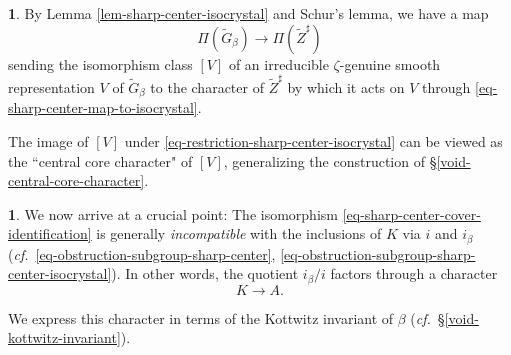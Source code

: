 \documentclass[10pt,english,reqno]{amsart}
\theoremstyle{definition}
\numberwithin{equation}{section}
\newtheorem{untitledsubsubsection}[subsubsection]{}
\newenvironment{void}
{\begin{untitledsubsubsection}}
{\end{untitledsubsubsection}}
\begin{document}
\begin{void}
By Lemma \ref{lem-sharp-center-isocrystal} and Schur's lemma, we have a map
\begin{equation}
\label{eq-restriction-sharp-center-isocrystal}
\Pi(\widetilde G_{\beta}) \rightarrow \Pi(\widetilde Z^{\sharp})
\end{equation}
sending the isomorphism class $[V]$ of an irreducible $\zeta$-genuine smooth representation $V$ of $\widetilde G_{\beta}$ to the character of $\widetilde Z^{\sharp}$ by which it acts on $V$ through \eqref{eq-sharp-center-map-to-isocrystal}.

The image of $[V]$ under \eqref{eq-restriction-sharp-center-isocrystal} can be viewed as the ``central core character" of $[V]$, generalizing the construction of \S\ref{void-central-core-character}.
\end{void}


\begin{void}
We now arrive at a crucial point: The isomorphism \eqref{eq-sharp-center-cover-identification} is generally \emph{incompatible} with the inclusions of $K$ via $i$ and $i_{\beta}$ (\emph{cf.}~\eqref{eq-obstruction-subgroup-sharp-center}, \eqref{eq-obstruction-subgroup-sharp-center-isocrystal}). In other words, the quotient $i_{\beta}/i$ factors through a character
\begin{equation}
\label{eq-isocrystal-sharp-kernel-difference}
K \rightarrow A.
\end{equation}

We express this character in terms of the Kottwitz invariant of $\beta$ (\emph{cf.}~\S\ref{void-kottwitz-invariant}).
\end{void}

\end{document}
